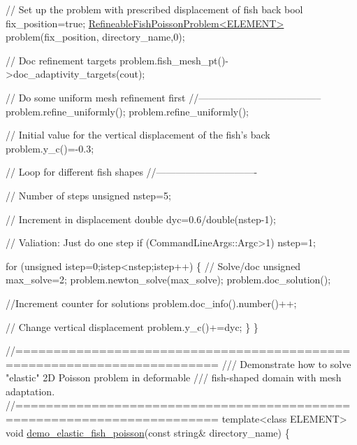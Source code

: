 \begin{DoxyCodeInclude}
{{{ \textcolor{comment}{// Set up the problem with prescribed displacement of fish back}
 \textcolor{keywordtype}{bool} fix\_position=\textcolor{keyword}{true};
 \hyperlink{classRefineableFishPoissonProblem}{RefineableFishPoissonProblem<ELEMENT>} problem(fix\_position,
      directory\_name,0);

 \textcolor{comment}{// Doc refinement targets}
 problem.fish\_mesh\_pt()->doc\_adaptivity\_targets(cout);
  
 \textcolor{comment}{// Do some uniform mesh refinement first}
 \textcolor{comment}{//--------------------------------------}
 problem.refine\_uniformly();
 problem.refine\_uniformly(); 

 \textcolor{comment}{// Initial value for the vertical displacement of the fish's back}
 problem.y\_c()=-0.3;

 \textcolor{comment}{// Loop for different fish shapes}
 \textcolor{comment}{//-------------------------------}

 \textcolor{comment}{// Number of steps}
 \textcolor{keywordtype}{unsigned} nstep=5;

 \textcolor{comment}{// Increment in displacement}
 \textcolor{keywordtype}{double} dyc=0.6/double(nstep-1);

 \textcolor{comment}{// Valiation: Just do one step}
 \textcolor{keywordflow}{if} (CommandLineArgs::Argc>1) nstep=1;
 
 \textcolor{keywordflow}{for} (\textcolor{keywordtype}{unsigned} istep=0;istep<nstep;istep++)
  \{    
   \textcolor{comment}{// Solve/doc}
   \textcolor{keywordtype}{unsigned} max\_solve=2; 
   problem.newton\_solve(max\_solve);
   problem.doc\_solution();
   
   \textcolor{comment}{//Increment counter for solutions }
   problem.doc\_info().number()++;    
   
   \textcolor{comment}{// Change vertical displacement}
   problem.y\_c()+=dyc;
  \} 
\}


\textcolor{comment}{//========================================================================}\textcolor{comment}{}
\textcolor{comment}{/// Demonstrate how to solve "elastic" 2D Poisson problem in deformable}
\textcolor{comment}{/// fish-shaped domain with mesh adaptation.}
\textcolor{comment}{}\textcolor{comment}{//========================================================================}
\textcolor{keyword}{template}<\textcolor{keyword}{class} ELEMENT>
\textcolor{keywordtype}{void} \hyperlink{algebraic__free__boundary__poisson_8cc_a28565f965d7ffb7f92f3773a6333023b}{demo\_elastic\_fish\_poisson}(\textcolor{keyword}{const} \textcolor{keywordtype}{string}& directory\_name)
\{

}}}
\end{DoxyCodeInclude}
